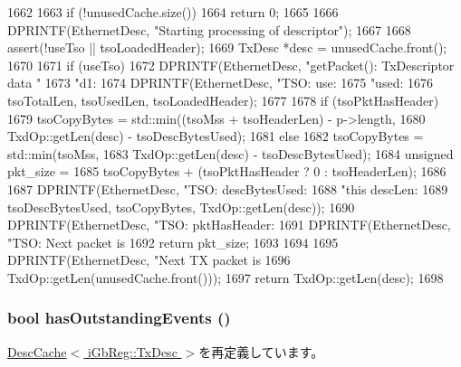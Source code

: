 \begin{DoxyCode}
1662 {
1663     if (!unusedCache.size())
1664         return 0;
1665  
1666     DPRINTF(EthernetDesc, "Starting processing of descriptor\n");
1667 
1668     assert(!useTso || tsoLoadedHeader);
1669     TxDesc *desc = unusedCache.front();
1670 
1671     if (useTso) {
1672         DPRINTF(EthernetDesc, "getPacket(): TxDescriptor data "
1673                 "d1: %
1674         DPRINTF(EthernetDesc, "TSO: use: %
1675                 "used: %
1676                 tsoTotalLen, tsoUsedLen, tsoLoadedHeader);
1677 
1678         if (tsoPktHasHeader) 
1679             tsoCopyBytes =  std::min((tsoMss + tsoHeaderLen) - p->length,
1680                                      TxdOp::getLen(desc) - tsoDescBytesUsed);
1681         else
1682             tsoCopyBytes =  std::min(tsoMss,
1683                                      TxdOp::getLen(desc) - tsoDescBytesUsed); 
1684         unsigned pkt_size =
1685             tsoCopyBytes + (tsoPktHasHeader ? 0 : tsoHeaderLen); 
1686 
1687         DPRINTF(EthernetDesc, "TSO: descBytesUsed: %
1688                 "this descLen: %
1689                 tsoDescBytesUsed, tsoCopyBytes, TxdOp::getLen(desc));
1690         DPRINTF(EthernetDesc, "TSO: pktHasHeader: %
1691         DPRINTF(EthernetDesc, "TSO: Next packet is %
1692         return pkt_size;
1693     }
1694 
1695     DPRINTF(EthernetDesc, "Next TX packet is %
1696             TxdOp::getLen(unusedCache.front()));
1697     return TxdOp::getLen(desc);
1698 }
\end{DoxyCode}
\hypertarget{classIGbE_1_1TxDescCache_a2587421ae644a9474416e5a5b63ccbca}{
\subsubsection[{hasOutstandingEvents}]{\setlength{\rightskip}{0pt plus 5cm}bool hasOutstandingEvents ()}}
\label{classIGbE_1_1TxDescCache_a2587421ae644a9474416e5a5b63ccbca}


\hyperlink{classIGbE_1_1DescCache_a09989bc9720a200c8164dc1ef109d70b}{DescCache$<$ iGbReg::TxDesc $>$}を再定義しています。



